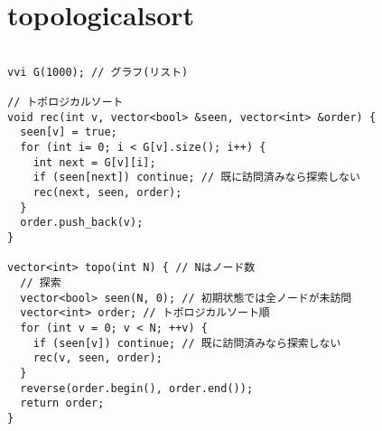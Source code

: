 \documentclass{jsarticle}
\begin{document}
\color{white}
\section{topologicalsort}
\color{black}
\begin{lstlisting}[caption=topologicalsort]

vvi G(1000); // グラフ(リスト)

// トポロジカルソート
void rec(int v, vector<bool> &seen, vector<int> &order) {
  seen[v] = true;
  for (int i= 0; i < G[v].size(); i++) {
    int next = G[v][i];
    if (seen[next]) continue; // 既に訪問済みなら探索しない
    rec(next, seen, order);
  }
  order.push_back(v);
}

vector<int> topo(int N) { // Nはノード数
  // 探索
  vector<bool> seen(N, 0); // 初期状態では全ノードが未訪問
  vector<int> order; // トポロジカルソート順
  for (int v = 0; v < N; ++v) {
    if (seen[v]) continue; // 既に訪問済みなら探索しない
    rec(v, seen, order);
  }
  reverse(order.begin(), order.end());
  return order;
}

\end{lstlisting}

\color{white}
\end{document}
